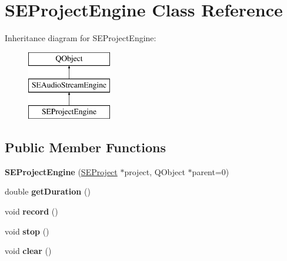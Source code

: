 \hypertarget{class_s_e_project_engine}{\section{S\+E\+Project\+Engine Class Reference}
\label{class_s_e_project_engine}
}
Inheritance diagram for S\+E\+Project\+Engine\+:\begin{figure}[H]
\begin{center}
\leavevmode
\includegraphics[height=3.000000cm]{class_s_e_project_engine}
\end{center}
\end{figure}
\subsection*{Public Member Functions}
\begin{DoxyCompactItemize}
\item 
\hypertarget{class_s_e_project_engine_abb5f13a09c01fe607dddde31da5e4fd1}{{\bfseries S\+E\+Project\+Engine} (\hyperlink{class_s_e_project}{S\+E\+Project} $\ast$project, Q\+Object $\ast$parent=0)}\label{class_s_e_project_engine_abb5f13a09c01fe607dddde31da5e4fd1}

\item 
\hypertarget{class_s_e_project_engine_a878e47d3eae756f4f8521a49d18dcca2}{double {\bfseries get\+Duration} ()}\label{class_s_e_project_engine_a878e47d3eae756f4f8521a49d18dcca2}

\item 
\hypertarget{class_s_e_project_engine_adf72e62511341059690d59af562fbb0f}{void {\bfseries record} ()}\label{class_s_e_project_engine_adf72e62511341059690d59af562fbb0f}

\item 
\hypertarget{class_s_e_project_engine_ab5d875c023cf7e083b1a7c90b1d9b622}{void {\bfseries stop} ()}\label{class_s_e_project_engine_ab5d875c023cf7e083b1a7c90b1d9b622}

\item 
\hypertarget{class_s_e_project_engine_aaae1596505f3ec4550cf7b7e6f40960f}{void {\bfseries clear} ()}\label{class_s_e_project_engine_aaae1596505f3ec4550cf7b7e6f40960f}

\end{DoxyCompactItemize}
